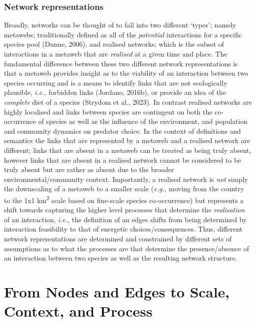 \documentclass[
]{article}
\begin{document}
\subsubsection{Network representations}\label{network-representations}

Broadly, networks can be thought of to fall into two different `types';
namely metawebs; traditionally defined as all of the \emph{potential}
interactions for a specific species pool (Dunne, 2006), and realised
networks; which is the subset of interactions in a metaweb that are
\emph{realised} at a given time and place. The fundamental difference
between these two different network representations is that a metaweb
provides insight as to the viability of an interaction between two
species occurring and is a means to identify links that are not
ecologically plausible, \emph{i.e.,} forbidden links (Jordano, 2016b),
or provide an idea of the \emph{complete} diet of a species (Strydom et
al., 2023). In contrast realised networks are highly localised and links
between species are contingent on both the co-occurrence of species as
well as the influence of the environment, and population and community
dynamics on predator choice. In the context of definitions and semantics
the links that are represented by a metaweb and a realised network are
different; links that are absent in a metaweb can be treated as being
truly absent, however links that are absent in a realised network cannot
be considered to be truly absent but are rather as absent due to the
broader environmental/community context. Importantly, a realised network
is \emph{not} simply the downscaling of a metaweb to a smaller scale
(\emph{e.g.,} moving from the country to the 1x1 km\textsuperscript{2}
scale based on fine-scale species co-occurrence) but represents a shift
towards capturing the higher level processes that determine the
\emph{realisation} of an interaction, \emph{i.e.,} the definition of an
edges shifts from being determined by interaction feasibility to that of
energetic choices/consequences. Thus, different network representations
are determined and constrained by different sets of assumptions as to
what the processes are that determine the presence/absence of an
interaction between two species as well as the resulting network
structure.

\section{From Nodes and Edges to Scale, Context, and
Process}\label{sec-process}
\end{document}
